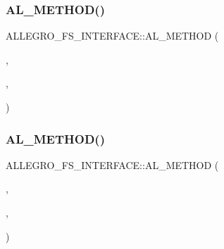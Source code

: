\mbox{\label{struct_a_l_l_e_g_r_o___f_s___i_n_t_e_r_f_a_c_e_aac0308a49ae7b12b3543ee163a735f08}} 
\subsubsection{\texorpdfstring{A\+L\+\_\+\+M\+E\+T\+H\+O\+D()}{AL\_METHOD()}\hspace{0.1cm}{\footnotesize\ttfamily [19/20]}}
{\footnotesize\ttfamily A\+L\+L\+E\+G\+R\+O\+\_\+\+F\+S\+\_\+\+I\+N\+T\+E\+R\+F\+A\+C\+E\+::\+A\+L\+\_\+\+M\+E\+T\+H\+OD (\begin{DoxyParamCaption}\item[{\hyperlink{astdbool_8h_abb452686968e48b67397da5f97445f5b}{bool}}]{,  }\item[{fs\+\_\+make\+\_\+directory}]{,  }\item[{(\hyperlink{zconf_8h_a2c212835823e3c54a8ab6d95c652660e}{const} char $\ast$\hyperlink{group___library_merger_ga79bd92474fc256263841144176127d9b}{path})}]{ }\end{DoxyParamCaption})}

\mbox{\label{struct_a_l_l_e_g_r_o___f_s___i_n_t_e_r_f_a_c_e_a28426999be150c416c671b7ab3abdd62}} 
\subsubsection{\texorpdfstring{A\+L\+\_\+\+M\+E\+T\+H\+O\+D()}{AL\_METHOD()}\hspace{0.1cm}{\footnotesize\ttfamily [20/20]}}
{\footnotesize\ttfamily A\+L\+L\+E\+G\+R\+O\+\_\+\+F\+S\+\_\+\+I\+N\+T\+E\+R\+F\+A\+C\+E\+::\+A\+L\+\_\+\+M\+E\+T\+H\+OD (\begin{DoxyParamCaption}\item[{\hyperlink{file_8h_a9c6d4681b238d8c79191fd6fcc4bd6f8}{A\+L\+L\+E\+G\+R\+O\+\_\+\+F\+I\+LE} $\ast$}]{,  }\item[{fs\+\_\+open\+\_\+file}]{,  }\item[{(\hyperlink{struct_a_l_l_e_g_r_o___f_s___e_n_t_r_y}{A\+L\+L\+E\+G\+R\+O\+\_\+\+F\+S\+\_\+\+E\+N\+T\+RY} $\ast$e, \hyperlink{zconf_8h_a2c212835823e3c54a8ab6d95c652660e}{const} char $\ast$\hyperlink{png_8h_a3eabae3e1e65723a7ec3445646cb7795}{mode})}]{ }\end{DoxyParamCaption})}



